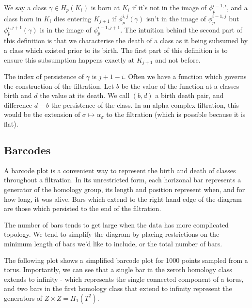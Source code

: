 We say a class $\gamma \in H_p(K_i)$ is born at $K_i$ if it's not in the image of $\phi_p^{i-1, i}$, and a class born in $K_i$ dies entering $K_{j+1}$ if $\phi_p^{i, j}(\gamma)$ isn't in the image of $\phi_p^{i-1, j}$ but $\phi_p^{i, j+1}(\gamma)$ is in the image of $\phi_p^{i-1, j+1}$. The intuition behind the second part of this definition is that we characterise the death of a class as it being subsumed by a class which existed prior to its birth. The first part of this definition is to ensure this subsumption happens exactly at $K_{j+1}$ and not before.

The index of persistence of $\gamma$ is $j + 1 - i$. Often we have a function which governs the construction of the filtration. Let $b$ be the value of the function at a classes birth and $d$ the value at its death. We call $(b, d)$ a birth death pair, and difference $d - b$ the persistence of the class. In an alpha complex filtration, this would be the extension of $\sigma \mapsto \alpha_{\sigma}$ to the filtration (which is possible because it is flat).


\subsection{Barcodes}

A barcode plot is a convenient way to represent the birth and death of classes throughout a filtration. In its unrestricted form, each horizonal bar represents a generator of the homology group, its length and position represent when, and for how long, it was alive. Bars which extend to the right hand edge of the diagram are those which persisted to the end of the filtration. 

The number of bars tends to get large when the data has more complicated topology. We tend to simplify the diagram by placing restrictions on the minimum length of bars we'd like to include, or the total number of bars.

The following plot shows a simplified barcode plot for 1000 points sampled from a torus. Importantly, we can see that a single bar in the zeroth homology class extends to infinity - which represents the single connected component of a torus, and two bars in the first homology class that extend to infinity represent the generators of $Z \times Z = H_1(T^2)$.

